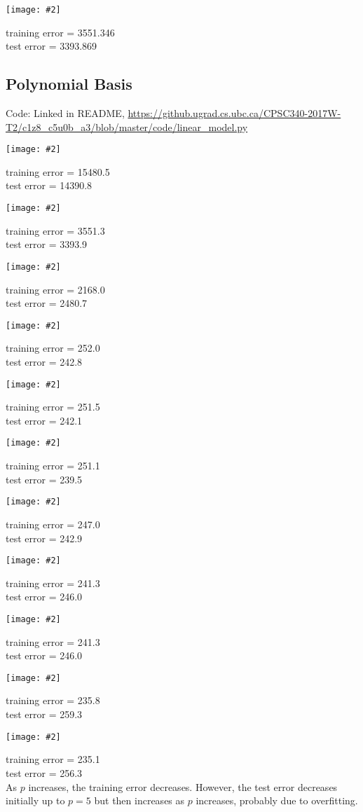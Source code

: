 \documentclass{article}
\newcommand{\centerfig}[2]{\begin{center}\texttt{[image: \#2]}\end{center}}
\begin{document}
\centerfig{.7}{../figs/least_squares_bias.pdf}  
{\centering training error = 3551.346 \\
test error = 3393.869 \\}

\subsection{Polynomial Basis}
Code: Linked in README, \url{https://github.ugrad.cs.ubc.ca/CPSC340-2017W-T2/c1z8_c5u0b_a3/blob/master/code/linear_model.py} \\
\centerfig{.7}{../figs/PolyBasis0.pdf} 
{\centering training error = 15480.5 \\
test error = 14390.8 \\}
\centerfig{.7}{../figs/PolyBasis1.pdf} 
{\centering training error = 3551.3 \\
test error = 3393.9 \\}
\centerfig{.7}{../figs/PolyBasis2.pdf} 
{\centering training error = 2168.0\\
test error = 2480.7 \\}
\centerfig{.7}{../figs/PolyBasis3.pdf} 
{\centering training error = 252.0 \\
test error = 242.8 \\}
\centerfig{.7}{../figs/PolyBasis4.pdf} 
{\centering training error = 251.5 \\
test error = 242.1 \\}
\centerfig{.7}{../figs/PolyBasis5.pdf} 
{\centering training error = 251.1 \\
test error = 239.5 \\}
\centerfig{.7}{../figs/PolyBasis6.pdf} 
{\centering training error = 247.0 \\
test error = 242.9 \\}
\centerfig{.7}{../figs/PolyBasis7.pdf} 
{\centering training error = 241.3 \\
test error = 246.0 \\}
\centerfig{.7}{../figs/PolyBasis8.pdf} 
{\centering training error = 241.3 \\
test error = 246.0 \\}
\centerfig{.7}{../figs/PolyBasis9.pdf} 
{\centering training error = 235.8 \\
test error = 259.3 \\}
\centerfig{.7}{../figs/PolyBasis10.pdf} 
{\centering training error = 235.1 \\
test error = 256.3 \\} 
\vspace*{10px}
{\centering As $p$ increases, the training error decreases. However, the test error decreases initially up to $p=5$ but then increases as $p$ increases, probably due to overfitting.}
\end{document}
